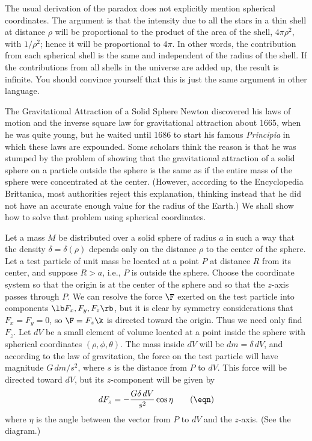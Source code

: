 The usual derivation of the paradox does not explicitly mention
spherical coordinates.  The argument is that the intensity due
to all the stars in a thin shell at distance $\rho$ will be
proportional to the product
of the area of the shell, $4\pi \rho^2$, with 
$1/\rho^2$; hence it will be proportional to $4\pi$.  In other
words, the contribution from each spherical shell is the same
and independent of the radius of the shell.  If the contributions
from all shells in the universe are added up, the result is
infinite.  You should convince yourself that this is just the
same argument in other language. 

\subhead The Gravitational Attraction of a Solid Sphere \endsubhead
Newton discovered his laws of
motion and the inverse square law for gravitational
attraction about 1665,
when he was quite young, 
%
but he waited until 1686 to start his famous
{\it Principia\/} in which these laws are expounded.   Some scholars
think the reason
 is that he was stumped by the problem
of showing that the gravitational
attraction of a solid sphere on a particle outside
the sphere  is the same as if the entire mass
of the sphere were concentrated
at the center.  (However, according to the Encyclopedia
Brittanica,  most authorities reject this explanation,
thinking instead that he did not have an accurate enough value for
the radius of the Earth.)  We shall show how to solve that problem
using spherical coordinates.

Let a mass $M$ be distributed over a solid sphere of radius
$a$ in such a way that the density $\delta = \delta(\rho)$
depends only on the distance $\rho$ to the center of the
sphere.  Let a test particle of unit mass be located at a point $P$ 
 at distance $R$ from its center, and suppose $R > a$, i.e., $P$ is
outside the sphere.   Choose the coordinate system so that the
origin is at the center of the sphere and so that the $z$-axis
passes through $P$.  
 We can resolve the force 
$\F$ exerted on
the test particle into components $\lb F_x, F_y, F_z \rb$,
but it is clear by symmetry considerations that $F_x = F_y = 0$, so
$\F = F_z\k$ is directed toward the origin.  Thus we need only
find $F_z$.  
Let $dV$ be a small element of volume
located at a point inside the sphere with spherical coordinates
$(\rho,\phi,\theta)$.   The mass inside $dV$ will be $dm = \delta\, dV$,
and according to the law of gravitation, the force on the test particle
will have magnitude $G\,dm/s^2$, where $s$ is the distance
from $P$ to $dV$.  This force will be directed toward $dV$, but
its $z$-component will be given by
\nexteqn
\xdef\Aa{\eqn}
$$
    dF_z = -\frac{G \delta \,dV}{s^2}\cos\eta\tag\eqn
$$
where $\eta$ is the angle between the vector from $P$ to $dV$
and the $z$-axis.  (See the diagram.)   

